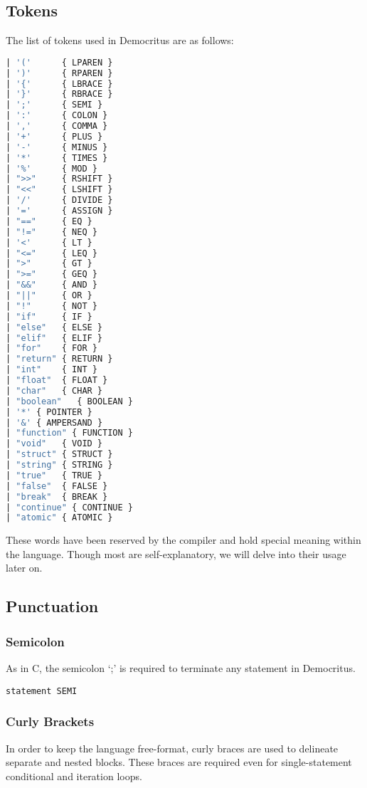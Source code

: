 	\subsection{Tokens}
		The list of tokens used in Democritus are as follows:
		\begin{lstlisting}[language=Caml]
| '('      { LPAREN }
| ')'      { RPAREN }
| '{'      { LBRACE }
| '}'      { RBRACE }
| ';'      { SEMI }
| ':'      { COLON }
| ','      { COMMA }
| '+'      { PLUS }
| '-'      { MINUS } 
| '*'      { TIMES }
| '%'      { MOD }
| ">>"     { RSHIFT }
| "<<"     { LSHIFT }
| '/'      { DIVIDE }
| '='      { ASSIGN }
| "=="     { EQ }
| "!="     { NEQ }
| '<'      { LT }
| "<="     { LEQ }
| ">"      { GT }
| ">="     { GEQ }
| "&&"     { AND }
| "||"     { OR }
| "!"      { NOT }
| "if"     { IF }
| "else"   { ELSE }
| "elif"   { ELIF }
| "for"    { FOR }
| "return" { RETURN }
| "int"    { INT }
| "float"  { FLOAT }
| "char"   { CHAR }
| "boolean"   { BOOLEAN }
| '*' { POINTER }
| '&' { AMPERSAND }
| "function" { FUNCTION }
| "void"   { VOID }
| "struct" { STRUCT }
| "string" { STRING }
| "true"   { TRUE }
| "false"  { FALSE }
| "break"  { BREAK } 
| "continue" { CONTINUE }
| "atomic" { ATOMIC }
		\end{lstlisting}
		
		\noindent These words have been reserved by the compiler and hold special meaning within the language. Though most are self-explanatory, we will delve into their usage later on. 
		
	\subsection{Punctuation}
		\subsubsection{Semicolon}
			As in C, the semicolon `;' is required to terminate any statement in Democritus. 
			
			\begin{lstlisting}
statement SEMI
			\end{lstlisting}
			
		\subsubsection{Curly Brackets}
			In order to keep the language free-format, curly braces are used to delineate separate and nested blocks. These braces are required even for single-statement conditional and iteration loops.
			
